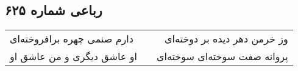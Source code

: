 \begin{center}
\section*{رباعی شماره ۶۲۵}
\label{sec:sh625}
\begin{longtable}{l p{0.5cm} r}
دارم صنمی چهره برافروخته‌ای
&&
وز خرمن دهر دیده بر دوخته‌ای
\\
او عاشق دیگری و من عاشق او
&&
پروانه صفت سوخته‌ای سوخته‌ای
\\
\end{longtable}
\end{center}
